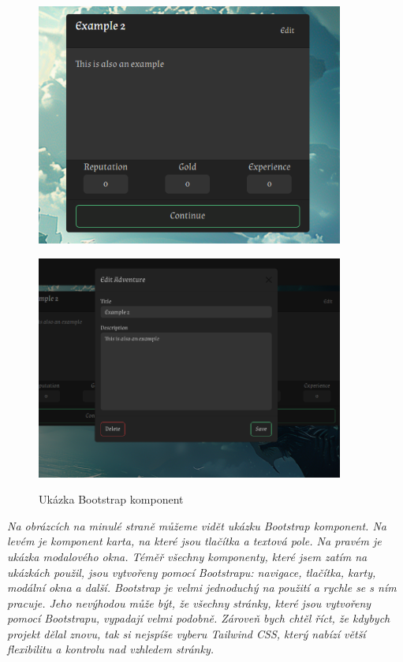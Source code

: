 \begin{figure}[H]
  \centering
  \begin{minipage}{0.4\textwidth}
    \centering
    \includegraphics[width=0.9\textwidth]{resources/figures/example9.png}
    \label{fig:example9}
  \end{minipage}
  \begin{minipage}{0.5\textwidth}
    \centering
    \includegraphics[width=0.9\textwidth]{resources/figures/example10.png}
    \label{fig:example10}
  \end{minipage}
  \caption{Ukázka Bootstrap komponent}
\end{figure}

\textit{Na obrázcích na minulé straně můžeme vidět ukázku Bootstrap komponent. Na levém je komponent karta, na které jsou tlačítka a textová pole. Na pravém je ukázka modalového okna. Téměř všechny komponenty, které jsem zatím na ukázkách použil, jsou vytvořeny pomocí Bootstrapu: navigace, tlačítka, karty, modální okna a další. Bootstrap je velmi jednoduchý na použití a rychle se s ním pracuje. Jeho nevýhodou může být, že všechny stránky, které jsou vytvořeny pomocí Bootstrapu, vypadají velmi podobně. Zároveň bych chtěl říct, že kdybych projekt dělal znovu, tak si nejspíše vyberu Tailwind CSS, který nabízí větší flexibilitu a kontrolu nad vzhledem stránky.}

